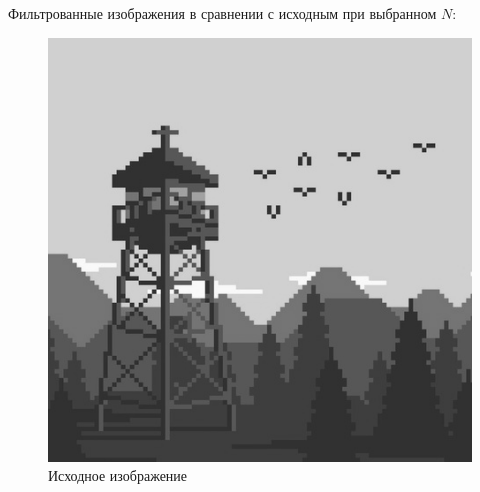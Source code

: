 \documentclass[a4paper]{article}
\begin{document}
Фильтрованные изображения в сравнении с исходным при выбранном $N$:

\begin{figure}[H]
    \centering
    \includegraphics[width=0.51\linewidth]{2/image.png}
    \caption{Исходное изображение}
\end{figure}\
\end{document}
